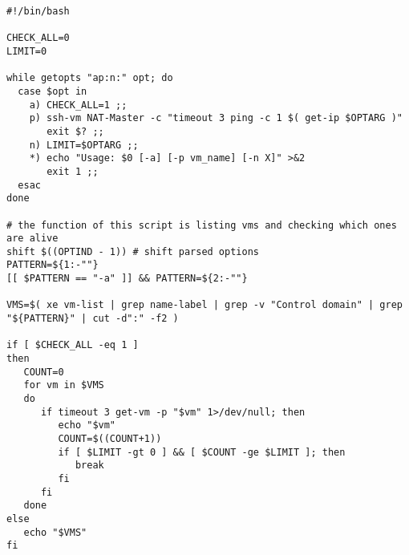 \begin{verbatim}
#!/bin/bash

CHECK_ALL=0
LIMIT=0

while getopts "ap:n:" opt; do
  case $opt in
    a) CHECK_ALL=1 ;;
    p) ssh-vm NAT-Master -c "timeout 3 ping -c 1 $( get-ip $OPTARG )"
       exit $? ;;
    n) LIMIT=$OPTARG ;;
    *) echo "Usage: $0 [-a] [-p vm_name] [-n X]" >&2
       exit 1 ;;
  esac
done

# the function of this script is listing vms and checking which ones are alive
shift $((OPTIND - 1)) # shift parsed options
PATTERN=${1:-""}
[[ $PATTERN == "-a" ]] && PATTERN=${2:-""}

VMS=$( xe vm-list | grep name-label | grep -v "Control domain" | grep "${PATTERN}" | cut -d":" -f2 )

if [ $CHECK_ALL -eq 1 ]
then
   COUNT=0
   for vm in $VMS
   do
      if timeout 3 get-vm -p "$vm" 1>/dev/null; then
         echo "$vm"
         COUNT=$((COUNT+1))
         if [ $LIMIT -gt 0 ] && [ $COUNT -ge $LIMIT ]; then
            break
         fi
      fi
   done
else
   echo "$VMS"
fi
\end{verbatim}